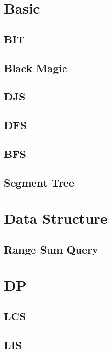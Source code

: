 \section{Basic}
    \subsection{BIT}
        
    \subsection{Black Magic}
        
    \subsection{DJS}
        
    \subsection{DFS}
        
    \subsection{BFS}
        
    \subsection{Segment Tree}
        

\section{Data Structure}
    \subsection{Range Sum Query}
        

\section{DP}
    \subsection{LCS}
        
    \subsection{LIS}
        
